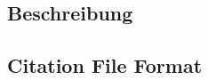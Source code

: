 \subsection{Beschreibung} %
\label{subsec:datenbeschaffung_beschreibung}
\subsection{Citation File Format} %
\label{subsec:datenbeschaffung_cff}
\subsection{} %
\label{subsec:datenbeschaffung_bibtex}
